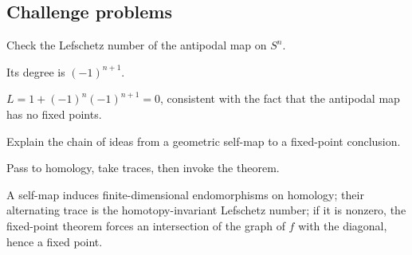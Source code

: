 \subsection*{Challenge problems}

\begin{exercise}\label{exr:viii35-ped-15}
Check the Lefschetz number of the antipodal map on $S^n$.
\end{exercise}
\begin{hint}
Its degree is $(-1)^{n+1}$.
\end{hint}
\begin{solution}
$L=1+(-1)^n(-1)^{n+1}=0$, consistent with the fact that the antipodal map has no fixed points.
\end{solution}

\begin{exercise}\label{exr:viii35-ped-16}
Explain the chain of ideas from a geometric self-map to a fixed-point conclusion.
\end{exercise}
\begin{hint}
Pass to homology, take traces, then invoke the theorem.
\end{hint}
\begin{solution}
A self-map induces finite-dimensional endomorphisms on homology; their alternating trace is the homotopy-invariant Lefschetz number; if it is nonzero, the fixed-point theorem forces an intersection of the graph of $f$ with the diagonal, hence a fixed point.
\end{solution}

